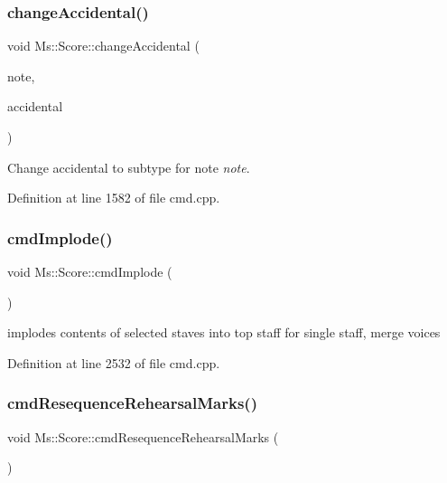 \subsubsection{\texorpdfstring{change\+Accidental()}{changeAccidental()}\hspace{0.1cm}{\footnotesize\ttfamily [2/2]}}
{\footnotesize\ttfamily void Ms\+::\+Score\+::change\+Accidental (\begin{DoxyParamCaption}\item[{\hyperlink{class_ms_1_1_note}{Note} $\ast$}]{note,  }\item[{Ms\+::\+Accidental\+Type}]{accidental }\end{DoxyParamCaption})}

Change accidental to subtype  for note {\itshape note}. 

Definition at line 1582 of file cmd.\+cpp.

\mbox{\label{class_ms_1_1_score_aea42629d00680cfa44bd1a9a4dd7b3f2}} 
\subsubsection{\texorpdfstring{cmd\+Implode()}{cmdImplode()}}
{\footnotesize\ttfamily void Ms\+::\+Score\+::cmd\+Implode (\begin{DoxyParamCaption}{ }\end{DoxyParamCaption})}

implodes contents of selected staves into top staff for single staff, merge voices 

Definition at line 2532 of file cmd.\+cpp.

\mbox{\label{class_ms_1_1_score_a1a542e214626dcb7ae103e6494f197b9}} 
\subsubsection{\texorpdfstring{cmd\+Resequence\+Rehearsal\+Marks()}{cmdResequenceRehearsalMarks()}}
{\footnotesize\ttfamily void Ms\+::\+Score\+::cmd\+Resequence\+Rehearsal\+Marks (\begin{DoxyParamCaption}{ }\end{DoxyParamCaption})}

